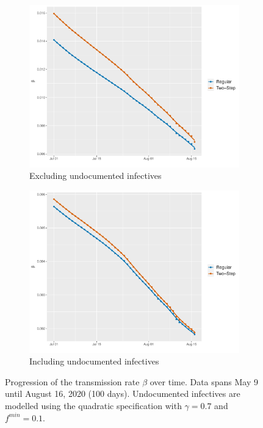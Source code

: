 \documentclass[12pt]{article}
\begin{document}
\begin{appendices}
		\begin{figure}[H]
    	    \centering
    	    \begin{subfigure}{0.495\textwidth}
    	      \centering
    	      \includegraphics[width=\linewidth]{output/panel_data_lag14_betas_rolling.pdf}
    	      \caption{Excluding undocumented infectives}
    	      \label{fig:beta_over_time_panel_data_rolling}
    	    \end{subfigure}
    	    \begin{subfigure}{0.495\textwidth}
    	      \centering
    	      \includegraphics[width=\linewidth]{output/panel_data_lag14_betas_UndocQuadratic_rolling.pdf}
    	      \caption{Including undocumented infectives}
    	      \label{fig:beta_over_time_panel_data_undoc_rolling}
    	    \end{subfigure}
    	    \caption{Progression of the transmission rate $\beta$ over time. Data spans May 9 until August 16, 2020 (100 days). Undocumented infectives are modelled using the quadratic specification with $\gamma = 0.7$ and $f^{min}=0.1$.}
    	    \label{fig:beta_over_time_panel_data_all}
    	\end{figure}
		

\end{appendices}
\end{document}
